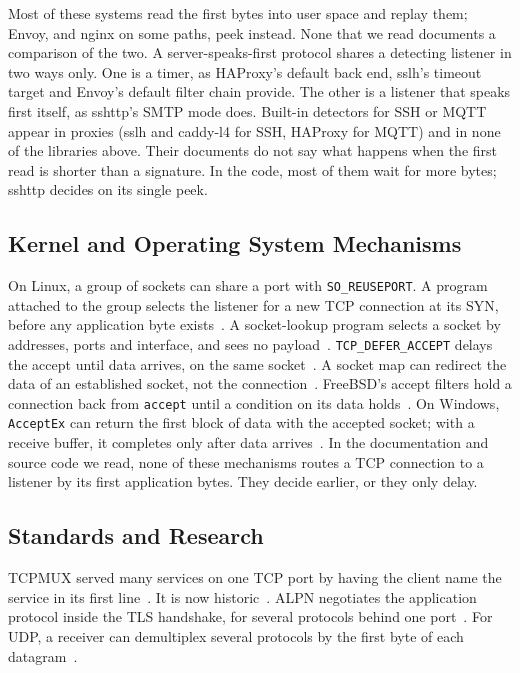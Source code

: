  Most of these systems read the first bytes into user space and replay
them; Envoy, and nginx on some paths, peek instead. None that we read documents a comparison of
the two. A server-speaks-first protocol shares a detecting listener in two ways only. One is a
timer, as HAProxy's default back end, sslh's timeout target and Envoy's default filter chain
provide. The other is a listener that speaks first itself, as sshttp's SMTP mode does. Built-in detectors for SSH or MQTT
appear in proxies (sslh and caddy-l4 for SSH, HAProxy for MQTT) and in none of the libraries
above. Their documents do not say what happens when the first read is shorter than a signature.
In the code, most of them wait for more bytes; sshttp decides on its single peek.

\subsection{Kernel and Operating System Mechanisms}\label{sec:kernel}

On Linux, a group of sockets can share a port with \texttt{SO\_REUSEPORT}. A program attached to
the group selects the listener for a new TCP connection at its SYN, before any application byte
exists~\cite{man2026socket,linux2026v72}. A socket-lookup program selects a socket by
addresses, ports and interface, and sees no payload~\cite{kernel2026sklookup}.
\texttt{TCP\_DEFER\_ACCEPT} delays the accept until data arrives, on the same
socket~\cite{man2026tcp}. A socket map can redirect the data of an established socket, not the
connection~\cite{kernel2026sockmap}. FreeBSD's accept filters hold a connection back from
\texttt{accept} until a condition on its data holds~\cite{freebsd2026acceptfilter}. On Windows,
\texttt{AcceptEx} can return the first block of data with the accepted socket; with a receive
buffer, it completes only after data arrives~\cite{microsoft2026acceptex}. In the documentation
and source code we read, none of these mechanisms routes a TCP connection to a listener by its
first application bytes. They decide earlier, or they only delay.

\subsection{Standards and Research}\label{sec:research}

TCPMUX served many services on one TCP port by having the client name the service in its first
line~\cite{lottor1988rfc1078}. It is now historic~\cite{zimmermann2016rfc7805}. ALPN negotiates
the application protocol inside the TLS handshake, for several protocols behind one
port~\cite{friedl2014rfc7301}. For UDP, a receiver can demultiplex several protocols by the first
byte of each datagram~\cite{aboba2023rfc9443}.

